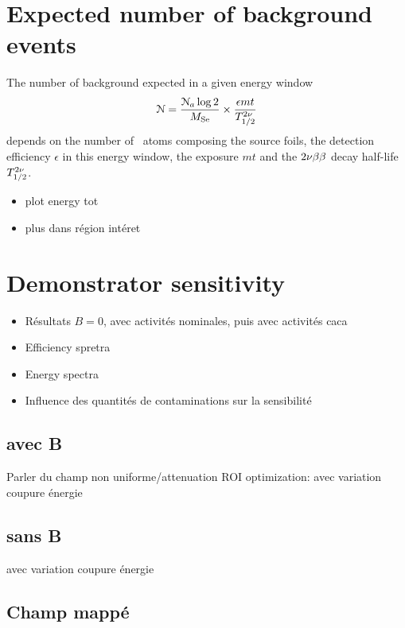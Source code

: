 



\section{Expected number of background events}

The number of background expected in a given energy window
\begin{equation}
\mathcal{N} = \frac{\mathcal{N}_{a}\log{2}}{M_{\text{Se}}}\times\frac{\epsilon m t}{T_{1/2}^{2\nu}}
\end{equation}
depends on the number of \Se\ atoms composing the source foils, the detection efficiency $\epsilon$ in this energy window, the exposure $mt$ and the $2\nu\beta\beta$ decay half-life $T_{1/2}^{2\nu}$.

\begin{itemize}
\item plot energy tot
\item plus dans région intéret
\end{itemize}

\section{Demonstrator sensitivity}
\begin{itemize}
\item Résultats $B=0$, avec activités nominales, puis avec activités caca
\item Efficiency spretra
\item Energy spectra
\item Influence des quantités de contaminations sur la sensibilité
\end{itemize}

\subsection{avec B}
Parler du champ non uniforme/attenuation
ROI optimization: avec variation coupure énergie\\

\subsection{sans B}
avec variation coupure énergie\\

\subsection{Champ mappé}



